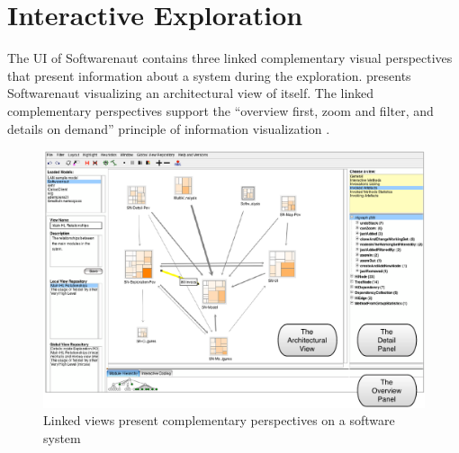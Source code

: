 \documentclass[preprint,12pt]{elsarticle}
\begin{document}




\section {Interactive Exploration} \label {sec:interact}
The UI of Softwarenaut contains three linked complementary visual perspectives that present information about a system during the exploration.  presents Softwarenaut visualizing an architectural view of itself. The linked complementary perspectives support the ``overview first, zoom and filter, and details on demand'' principle of information visualization \cite{shneid-eyes}. 



\begin{figure}[ht]
\begin{center}
\includegraphics[width=\linewidth]{SnautOnSnaut.pdf}
\caption{Linked views present complementary perspectives on a software system }
\end{center}
\end{figure}
\end{document}
